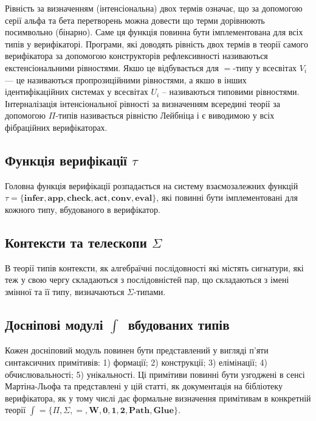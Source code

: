 \documentclass{article}
\theoremstyle{definition}
\newcommand*{\sigmatype}{$\Sigma$}
\newcommand*{\presheaf}{$\mathbb{\int}$}
\begin{document}
Рівність за визначенням (інтенсіональна) двох термів означає, що за допомогою серії альфа та бета
перетворень можна довести що терми дорівнюють посимвольно (бінарно). Саме ця функція повинна бути
імплементована для всіх типів у верифікаторі. Програми, які доводять рівність двох термів
в теорії самого верифікатора за допомогою конструкторів рефлексивності називаються екстенсіональними рівностями.
Якшо це відбувається для $=$-типу у всесвітах $V_i$ --- це називаються пропрозиційними рівностями,
а якшо в інших ідентифікаційних системах у всесвітах $U_i$ -- називаються типовими рівностями.
Інтерналізація інтенсіональної рівності за визначенням всередині теорії за
допомогою $\Pi$-типів називається рівністю Лейбніца і є виводимою у всіх фібраційних верифікаторах.

\subsection*{Функція верифікації $\tau$}

Головна функція верифікації  розпадається на систему взаємозалежних функцій
$\tau = \{ \mathbf{infer},\mathbf{app}, \mathbf{check}, \mathbf{act}, \mathbf{conv}, \mathbf{eval} \}$,
які повинні бути імплементовані для кожного типу, вбудованого в верифікатор.

\subsection*{Контексти та телескопи \sigmatype }

В теорії типів контексти, як алгебраїчні послідовності які містять сигнатури, які теж у свою
чергу складаються з послідовністей пар, що складаються з імені змінної та її типу, визначаються
$\Sigma$-типами.

\subsection*{Досніпові модулі \presheaf\ вбудованих типів}

Кожен досніповий модуль повинен бути представлений у вигляді п'яти
синтаксичних примітивів: 1) формації; 2) конструкції; 3) елімінації;
4) обчислювальності; 5) унікальності. Ці примітиви повинні бути узгоджені
в сенсі Мартіна-Льофа та представлені у цій статті,
як документація на бібліотеку верифікатора, як у тому числі дає формальне визначення
примітивам в конкретній теорії $\mathrm{\int} = \{ \Pi, \Sigma, =, \mathbf{W},
\mathbf{0}, \mathbf{1}, \mathbf{2}, \mathbf{Path}, \mathbf{Glue} \}$.
\end{document}
